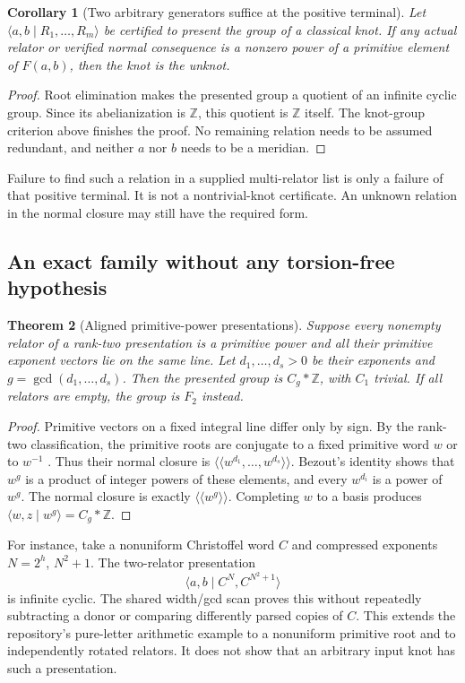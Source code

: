 \documentclass[11pt,letterpaper]{article}
\newtheorem{theorem}{Theorem}[section]
\newtheorem{corollary}[theorem]{Corollary}
\theoremstyle{definition}
\newcommand{\Z}{\mathbb Z}
\newcommand{\nc}[1]{\langle\!\langle #1\rangle\!\rangle}
\begin{document}
\begin{corollary}[Two arbitrary generators suffice at the positive terminal]
\label{cor:unknot}
Let $\langle a,b\mid R_1,\ldots,R_m\rangle$ be certified to present the group
of a classical knot. If any actual relator or verified normal consequence is
a nonzero power of a primitive element of $F(a,b)$, then the knot is the
unknot.
\end{corollary}
\begin{proof}
Root elimination makes the presented group a quotient of an infinite cyclic
group. Since its abelianization is $\Z$, this quotient is $\Z$ itself.
The knot-group criterion above finishes the proof. No remaining relation
needs to be assumed redundant, and neither $a$ nor $b$ needs to be a meridian.
\end{proof}

Failure to find such a relation in a supplied multi-relator list is only a
failure of that positive terminal. It is not a nontrivial-knot certificate.
An unknown relation in the normal closure may still have the required form.

\subsection{An exact family without any torsion-free hypothesis}
\begin{theorem}[Aligned primitive-power presentations]
\label{thm:aligned}
Suppose every nonempty relator of a rank-two presentation is a primitive
power and all their primitive exponent vectors lie on the same line. Let
$d_1,\ldots,d_s>0$ be their exponents and $g=\gcd(d_1,\ldots,d_s)$.
Then the presented group is $C_g*\Z$, with $C_1$ trivial. If all relators
are empty, the group is $F_2$ instead.
\end{theorem}
\begin{proof}
Primitive vectors on a fixed integral line differ only by sign. By the
rank-two classification, the primitive roots are conjugate to a fixed
primitive word $w$ or to $w^{-1}$ \cite{KR}. Thus their normal closure is
$\nc{w^{d_1},\ldots,w^{d_s}}$. Bezout's identity shows that $w^g$ is a product
of integer powers of these elements, and every $w^{d_i}$ is a power of $w^g$.
The normal closure is exactly $\nc{w^g}$. Completing $w$ to a basis produces
$\langle w,z\mid w^g\rangle=C_g*\Z$.
\end{proof}

For instance, take a nonuniform Christoffel word $C$ and compressed exponents
$N=2^h$, $N^2+1$. The two-relator presentation
\[
 \langle a,b\mid C^N,C^{N^2+1}\rangle
\]
is infinite cyclic. The shared width/gcd scan proves this without repeatedly
subtracting a donor or comparing differently parsed copies of $C$.
This extends the repository's pure-letter arithmetic example to a
nonuniform primitive root and to independently rotated relators. It does
not show that an arbitrary input knot has such a presentation.
\end{document}
